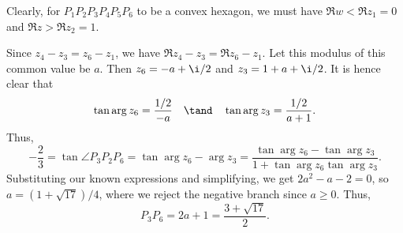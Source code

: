 \begin{solution}
\begin{ppart}
\begin{center}
        \end{center}

        Clearly, for $P_1 P_2 P_3 P_4 P_5 P_6$ to be a convex hexagon, we must have $\Re{w} < \Re{z_1} = 0$ and $\Re{z} > \Re{z_2} = 1$.
    \end{ppart}
    \begin{ppart}
        Since $z_4 - z_3 = z_6 - z_1$, we have $\Re{z_4 - z_3} = \Re{z_6 - z_1}$. Let this modulus of this common value be $a$. Then $z_6 = -a + \i/2$ and $z_3 = 1 + a + \i/2$. It is hence clear that \[\tan \arg z_6 = \frac{1/2}{-a} \quad \tand \quad \tan \arg z_3 = \frac{1/2}{a + 1}.\] Thus, \[-\frac23 = \tan \angle P_3 P_2 P_6 = \tan{\arg z_6 - \arg z_3} = \frac{\tan \arg z_6 - \tan \arg z_3}{1 + \tan \arg z_6 \tan \arg z_3}.\] Substituting our known expressions and simplifying, we get $2a^2 - a - 2 = 0$, so $a = (1 + \sqrt{17})/4$, where we reject the negative branch since $a \geq 0$. Thus, \[P_3 P_6 = 2a + 1 = \frac{3 + \sqrt{17}}{2}.\]
    \end{ppart}
\end{solution}

